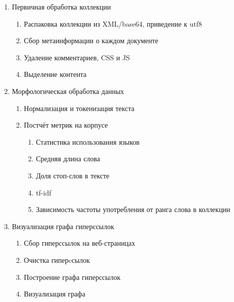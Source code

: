 \documentclass[twocolumn]{article}
\begin{document}
\begin{enumerate}
	\item Первичная обработка коллекции
	\begin{enumerate}
    \item Распаковка коллекции из XML/base64, приведение к utf8
    \item Сбор метаинформации о каждом документе
    \item Удаление комментариев, CSS и JS
    \item Выделение контента
	\end{enumerate}
	\item Морфологическая обработка данных
	\begin{enumerate}
		\item Нормализация и токенизация текста 
		\item Постчёт метрик на корпусе
		\begin{enumerate}
			\item Статистика использования языков
			\item Средняя длина слова
			\item Доля стоп-слов в тексте
			\item tf-idf
			\item Зависимость частоты употребления от ранга слова в коллекции 
		\end{enumerate}
	\end{enumerate}
	\item Визуализация графа гиперссылок
	\begin{enumerate}
		\item Сбор гиперссылок на веб-страницах
		\item Очистка гиперcсылок
		\item Построение графа гиперссылок
		\item Визуализация графа
	\end{enumerate}
\end{enumerate}






\end{document}
